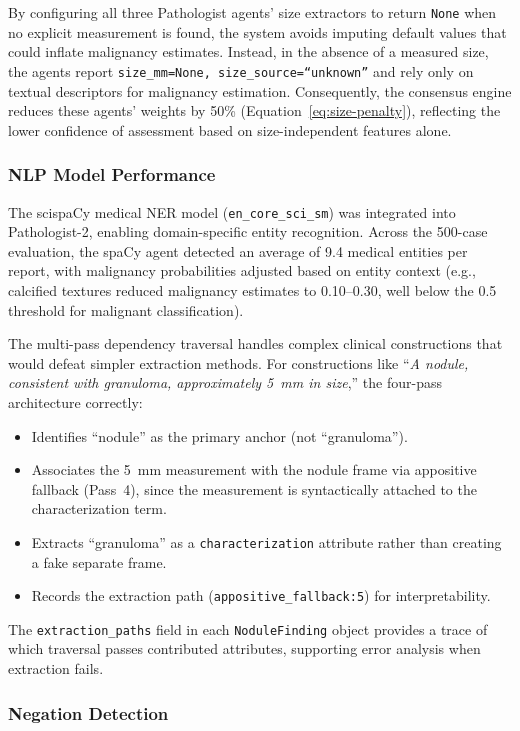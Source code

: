 \documentclass[12pt]{article}
\begin{document}
By configuring all three Pathologist agents' size extractors to return \texttt{None} when no explicit measurement is found, the system avoids imputing default values that could inflate malignancy estimates. Instead, in the absence of a measured size, the agents report \texttt{size\_mm=None, size\_source=``unknown''} and rely only on textual descriptors for malignancy estimation. Consequently, the consensus engine reduces these agents' weights by 50\% (Equation~\ref{eq:size-penalty}), reflecting the lower confidence of assessment based on size-independent features alone.

\subsubsection{NLP Model Performance}

The scispaCy medical NER model (\texttt{en\_core\_sci\_sm}) was integrated into Pathologist-2, enabling domain-specific entity recognition. Across the 500-case evaluation, the spaCy agent detected an average of 9.4 medical entities per report, with malignancy probabilities adjusted based on entity context (e.g., calcified textures reduced malignancy estimates to 0.10--0.30, well below the 0.5 threshold for malignant classification).

The multi-pass dependency traversal handles complex clinical constructions that would defeat simpler extraction methods. For constructions like ``\textit{A nodule, consistent with granuloma, approximately 5~mm in size},'' the four-pass architecture correctly:
\begin{itemize}
    \item Identifies ``nodule'' as the primary anchor (not ``granuloma'').
    \item Associates the 5~mm measurement with the nodule frame via appositive fallback (Pass~4), since the measurement is syntactically attached to the characterization term.
    \item Extracts ``granuloma'' as a \texttt{characterization} attribute rather than creating a fake separate frame.
    \item Records the extraction path (\texttt{appositive\_fallback:5}) for interpretability.
\end{itemize}
The \texttt{extraction\_paths} field in each \texttt{NoduleFinding} object provides a trace of which traversal passes contributed attributes, supporting error analysis when extraction fails.

\subsubsection{Negation Detection}
\end{document}
